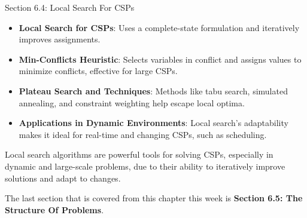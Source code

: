 \begin{notes}{Section 6.4: Local Search For CSPs}
\begin{highlight}
    \end{highlight}
    
    \begin{highlight}
    
        \begin{itemize}
            \item \textbf{Local Search for CSPs}: Uses a complete-state formulation and iteratively improves assignments.
            \item \textbf{Min-Conflicts Heuristic}: Selects variables in conflict and assigns values to minimize conflicts, effective for large CSPs.
            \item \textbf{Plateau Search and Techniques}: Methods like tabu search, simulated annealing, and constraint weighting help escape local optima.
            \item \textbf{Applications in Dynamic Environments}: Local search's adaptability makes it ideal for real-time and changing CSPs, such as scheduling.
        \end{itemize}
    
        Local search algorithms are powerful tools for solving CSPs, especially in dynamic and large-scale problems, due to their ability to iteratively improve solutions and adapt to changes.
    
    \end{highlight}
\end{notes}

The last section that is covered from this chapter this week is \textbf{Section 6.5: The Structure Of Problems}.

